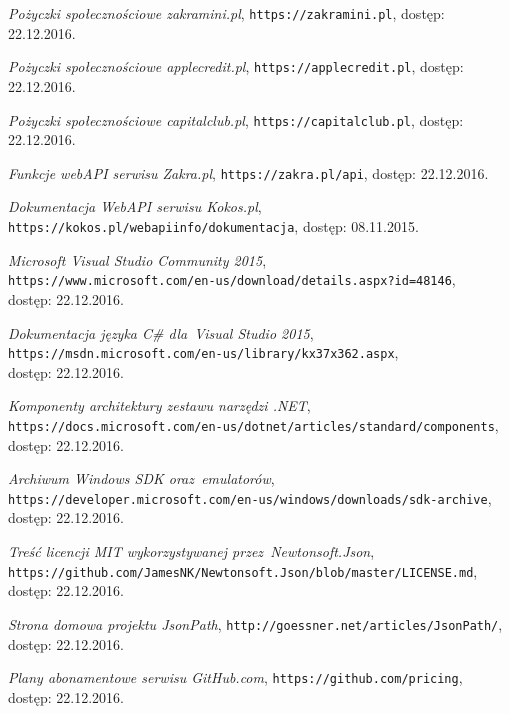 \documentclass[a4paper,twoside,titlepage,openright]{book}
\begin{document}
\begin{thebibliography}{99}
 \textit{Pożyczki społecznościowe zakramini.pl}, 
\texttt{https://zakramini.pl}, dostęp: 22.12.2016.

 \textit{Pożyczki społecznościowe applecredit.pl}, 
\texttt{https://applecredit.pl}, dostęp: 22.12.2016.

 \textit{Pożyczki społecznościowe capitalclub.pl}, 
\texttt{https://capitalclub.pl}, dostęp: 22.12.2016.

 \textit{Funkcje webAPI serwisu Zakra.pl}, 
\texttt{https://zakra.pl/api}, dostęp: 22.12.2016.

 \textit{Dokumentacja WebAPI serwisu Kokos.pl}, 
\texttt{https://kokos.pl/webapiinfo/dokumentacja}, dostęp: 08.11.2015.

 \textit{Microsoft Visual Studio Community 2015}, \\
\texttt{https://www.microsoft.com/en-us/download/details.aspx?id=48146}, \\dostęp: 22.12.2016.

 \textit{Dokumentacja języka C\# dla~Visual Studio 2015}, \\
\texttt{https://msdn.microsoft.com/en-us/library/kx37x362.aspx}, \\dostęp: 22.12.2016.

 \textit{Komponenty architektury zestawu narzędzi .NET}, \\
\texttt{https://docs.microsoft.com/en-us/dotnet/articles/standard/components},\\ dostęp: 22.12.2016.

 \textit{Archiwum Windows SDK oraz~emulatorów}, \\
\texttt{https://developer.microsoft.com/en-us/windows/downloads/sdk-archive}, \\dostęp: 22.12.2016.

 \textit{Treść licencji MIT wykorzystywanej przez~Newtonsoft.Json}, \\
\texttt{https://github.com/JamesNK/Newtonsoft.Json/blob/master/LICENSE.md}, \\dostęp: 22.12.2016.

 \textit{Strona domowa projektu JsonPath}, 
\texttt{http://goessner.net/articles/JsonPath/}, \\dostęp: 22.12.2016.

 \textit{Plany abonamentowe serwisu GitHub.com}, 
\texttt{https://github.com/pricing}, \\dostęp: 22.12.2016.


\end{thebibliography}
\end{document}
